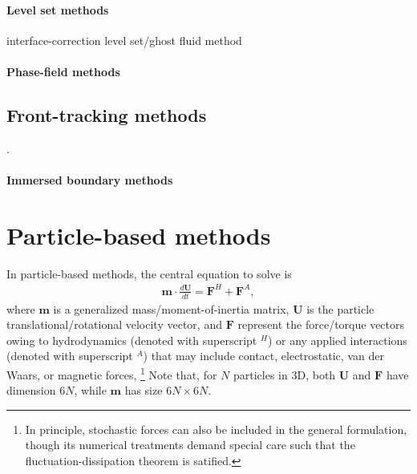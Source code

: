 \medskip
\paragraph{\bf Level set methods}

interface-correction level set/ghost fluid method \citep{ICLS}


\medskip
\paragraph{\bf Phase-field methods}



\subsection{Front-tracking methods}

\cite{unverdi_tryggvason_1992a}.

\medskip
\paragraph{\bf Immersed boundary methods}

\cite{mittal_iaccarino_2005a, Wim-Paul_JCP_2012}



\section{Particle-based methods}
\label{sec:num-dem}

In particle-based methods, the central equation to solve is
\begin{equation} 
 \begin{aligned} \label{eq:force-balance}
  {\bm m} \cdot \frac{d{\bm U}}{dt} = {\bm F}^H + {\bm F}^A, 
 \end{aligned}
\end{equation}
where ${\bm m}$ is a generalized mass/moment-of-inertia matrix,
${\bm U}$ is the particle translational/rotational velocity vector,
and ${\bm F}$ represent the force/torque vectors owing to hydrodynamics (denoted with superscript $^H$) or any applied interactions (denoted with superscript $^A$) that may include contact, electrostatic, van der Waars, or magnetic forces, \etc \footnote{In principle, stochastic forces can also be included in the general formulation, though its numerical treatments demand special care such that the fluctuation-dissipation theorem is satified.}
Note that, for $N$ particles in 3D, both ${\bm U}$ and ${\bm F}$ have dimension $6N$, while ${\bm m}$ has size $6N \times 6N$.

